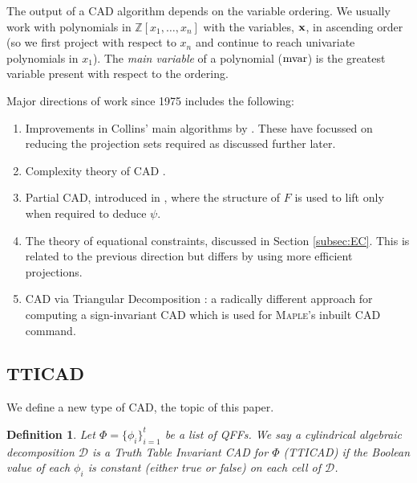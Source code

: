 \documentclass{article}
\newtheorem{definition}{Definition}
\begin{document}
\par
The output of a CAD algorithm depends on the variable ordering.  We usually work with polynomials in $\mathbb{Z}[x_1,\ldots,x_n]$ with the variables, ${\bf x}$, in ascending order (so we first project with respect to $x_n$ and continue to reach  univariate polynomials in $x_1$).  The \textit{main variable} of a polynomial (${\rm mvar}$) is the greatest variable present with respect to the ordering. 
\par
Major directions of work since 1975 includes the following:
\begin{enumerate}[itemsep=-5pt,topsep=-8pt]
\item Improvements in Collins' main algorithms by \cite[and many others]{McCallum1988}. These have focussed on reducing the projection sets required as 
discussed further later. 
\item Complexity theory of CAD \cite{BrownDavenport2007,DavenportHeintz1988}.
\item Partial CAD, introduced in \cite{CollinsHong1991}, where the structure of $F$ is used to lift only when required to deduce $\psi$.
\item The theory of equational constraints, 
\cite{McCallum1999a,McCallum2001,BrownMcCallum2005} discussed in Section \ref{subsec:EC}.  This is related to the previous direction but differs by using more efficient projections.  \item CAD via Triangular Decomposition \cite{Chenetal2009d}: a radically different approach for computing a sign-invariant CAD which is used for \textsc{Maple}'s inbuilt CAD command.
\end{enumerate}

\subsection{TTICAD}
\label{sec:Problem}

We define a new type of CAD, the topic of this paper.
\begin{definition}
Let $\Phi = \{ \phi_i\}_{i=1}^t$ be a list of QFFs.
We say a cylindrical algebraic decomposition $\mathcal{D}$ is a {\em Truth Table Invariant} CAD for $\Phi$ (TTICAD) if the Boolean value of each $\phi_i$ is constant (either true or false) on each cell of $\mathcal{D}$.
\end{definition}
\end{document}
